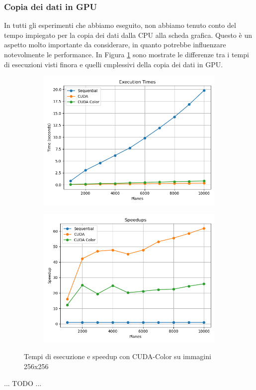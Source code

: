 \subsubsection{Copia dei dati in GPU}
In tutti gli esperimenti che abbiamo eseguito, non abbiamo tenuto conto del tempo impiegato per la copia dei dati dalla CPU alla scheda grafica.
Questo è un aspetto molto importante da considerare, in quanto potrebbe influenzare notevolmente le performance.
In Figura \ref{fig:cuda_memcpy} sono mostrate le differenze tra i tempi di esecuzioni visti finora e quelli cmplessivi della copia dei dati in GPU.
\begin{figure}[H]
    \centering
    \begin{subfigure}{0.49\textwidth}
        \centering
        \includegraphics[width=\textwidth]{../results/plots/256/cuda_color_times}
    \end{subfigure}
    \begin{subfigure}{0.49\textwidth}
        \centering
        \includegraphics[width=\textwidth]{../results/plots/256/cuda_color_speedup}
    \end{subfigure}
    \caption{Tempi di esecuzione e speedup con CUDA-Color su immagini 256x256}
    \label{fig:cuda_memcpy}
\end{figure}
... TODO ...
